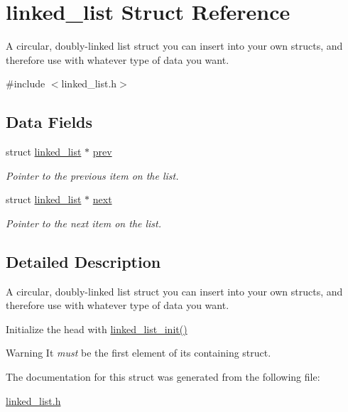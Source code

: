 \hypertarget{structlinked__list}{
\section{linked\_\-list Struct Reference}
\label{structlinked__list}
}


A circular, doubly-\/linked list struct you can insert into your own structs, and therefore use with whatever type of data you want.  




{\ttfamily \#include $<$linked\_\-list.h$>$}

\subsection*{Data Fields}
\begin{DoxyCompactItemize}
\item 
\hypertarget{structlinked__list_a32be641487617a69cd48ee94725f3273}{
struct \hyperlink{structlinked__list}{linked\_\-list} $\ast$ \hyperlink{structlinked__list_a32be641487617a69cd48ee94725f3273}{prev}}
\label{structlinked__list_a32be641487617a69cd48ee94725f3273}

\begin{DoxyCompactList}\small\item\em Pointer to the previous item on the list. \end{DoxyCompactList}\item 
\hypertarget{structlinked__list_af26edbe8295d8a630ae63411d5d4f3ff}{
struct \hyperlink{structlinked__list}{linked\_\-list} $\ast$ \hyperlink{structlinked__list_af26edbe8295d8a630ae63411d5d4f3ff}{next}}
\label{structlinked__list_af26edbe8295d8a630ae63411d5d4f3ff}

\begin{DoxyCompactList}\small\item\em Pointer to the next item on the list. \end{DoxyCompactList}\end{DoxyCompactItemize}


\subsection{Detailed Description}
A circular, doubly-\/linked list struct you can insert into your own structs, and therefore use with whatever type of data you want. 

Initialize the head with \hyperlink{linked__list_8h_a31234c44f45a2cb8fd7e01130d9fb871}{linked\_\-list\_\-init()}

\begin{DoxyWarning}{Warning}
It {\itshape must\/} be the first element of its containing struct. 
\end{DoxyWarning}


The documentation for this struct was generated from the following file:\begin{DoxyCompactItemize}
\item 
\hyperlink{linked__list_8h}{linked\_\-list.h}\end{DoxyCompactItemize}
